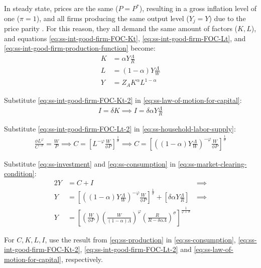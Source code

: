 \documentclass[
	thesis.tex
	]{subfiles}
\begin{document}
In steady state, prices are the same ($P = P^\ast$), resulting in a gross inflation level of one ($\pi=1$), and all firms producing the same output level ($Y_j=Y$) due to the price parity \cite[Lecture 13, p.12]{solis-garcia_ucb_2022}. For this reason, they all demand the same amount of factors ($K,L$), and equations \ref{eq:ss-int-good-firm-FOC-Kt}, \ref{eq:ss-int-good-firm-FOC-Lt}, and \ref{eq:ss-int-good-firm-production-function} become:
\begin{align}
	K &= \alpha Y \frac{\Lambda}{R} \label{eq:ss-int-good-firm-FOC-Kt-2} \\
	L &= (1-\alpha) Y \frac{\Lambda}{W} \label{eq:ss-int-good-firm-FOC-Lt-2} \\
	Y &= Z_{A} K^\alpha L^{1-\alpha} \label{eq:ss-int-good-firm-production-function-2}
\end{align}

Substitute \ref{eq:ss-int-good-firm-FOC-Kt-2} in \ref{eq:ss-law-of-motion-for-capital}:
\begin{align}
	\label{eq:ss-investment}
	I = \delta K \implies I = \delta \alpha Y \frac{\Lambda}{R}
\end{align}

Substitute \ref{eq:ss-int-good-firm-FOC-Lt-2} in \ref{eq:ss-household-labor-supply}:
\begin{align}
	\label{eq:ss-consumption}
	\frac{\phi L^{\varphi}}{C^{-\sigma}} = \frac{W}{P}
	\implies
	C = \left[ L^{-\varphi} \frac{W}{\phi P} \right]^{\frac{1}{\sigma}}
	\implies
	C = \left[ \left( (1-\alpha) Y \frac{\Lambda}{W} \right)^{-\varphi} \frac{W}{\phi P} \right]^{\frac{1}{\sigma}}
\end{align}

Substitute \ref{eq:ss-investment} and \ref{eq:ss-consumption} in \ref{eq:ss-market-clearing-condition}:
\begin{alignat}{2}
	Y &= C + I &\implies \nonumber \\
	Y &= \left[ \left( (1-\alpha) Y \frac{\Lambda}{W} \right)^{-\varphi} \frac{W}{\phi P} \right]^{\frac{1}{\sigma}} + \left[ \delta \alpha Y \frac{\Lambda}{R} \right] &\implies \nonumber \\
	Y &=\left[
	\left( \frac{W}{\phi P}                \right)
	\left( \frac{W}{(1-\alpha)\Lambda}     \right)^\varphi
	\left( \frac{R}{R-\delta\alpha\Lambda} \right)^\sigma
	\right]^\frac{1}{\varphi+\sigma} & \label{eq:ss-production}
\end{alignat}

For $C,K,L,I$, use the result from \ref{eq:ss-production} in \ref{eq:ss-consumption}, \ref{eq:ss-int-good-firm-FOC-Kt-2}, \ref{eq:ss-int-good-firm-FOC-Lt-2} and \ref{eq:ss-law-of-motion-for-capital}, respectively.
\end{document}

